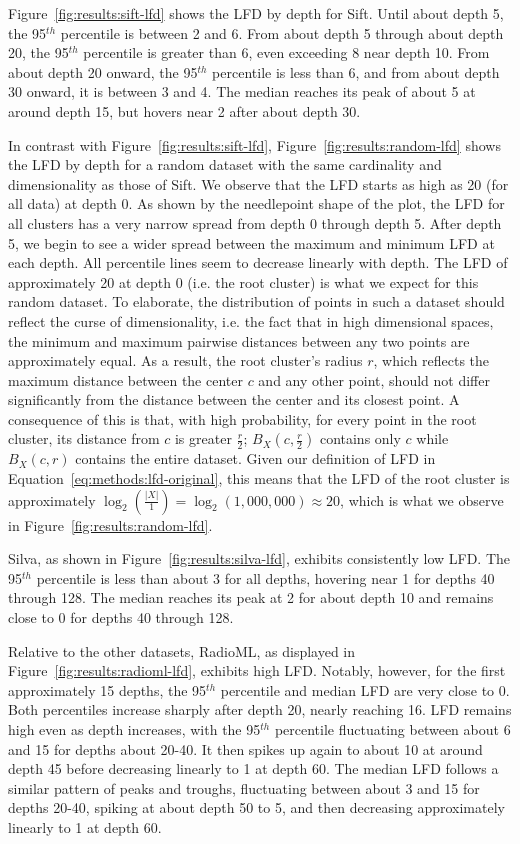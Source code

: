 Figure~\ref{fig:results:sift-lfd} shows the LFD by depth for Sift.
Until about depth 5, the 95$^{th}$ percentile is between 2 and 6.
From about depth 5 through about depth 20, the 95$^{th}$ percentile is greater than 6, even exceeding 8 near depth 10.
From about depth 20 onward, the 95$^{th}$ percentile is less than 6, and from about depth 30 onward, it is between 3 and 4.
The median reaches its peak of about 5 at around depth 15, but hovers near 2 after about depth 30.

In contrast with Figure~\ref{fig:results:sift-lfd}, Figure~\ref{fig:results:random-lfd} shows the LFD by depth for a random dataset with the same cardinality and dimensionality as those of Sift.
We observe that the LFD starts as high as 20 (for all data) at depth 0.
As shown by the needlepoint shape of the plot, the LFD for all clusters has a very narrow spread from depth 0 through depth 5.
After depth 5, we begin to see a wider spread between the maximum and minimum LFD at each depth.
All percentile lines seem to decrease linearly with depth.
The LFD of approximately 20 at depth 0 (i.e. the root cluster) is what we expect for this random dataset.
To elaborate, the distribution of points in such a dataset should reflect the curse of dimensionality, i.e. the fact that in high dimensional spaces, the minimum and maximum pairwise distances between any two points are approximately equal.
As a result, the root cluster's radius $r$, which reflects the maximum distance between the center $c$ and any other point, should not differ significantly from the distance between the center and its closest point.
A consequence of this is that, with high probability, for every point in the root cluster, its distance from $c$ is greater $\tfrac{r}{2}$;
$B_X(c, \tfrac{r}{2})$ contains only $c$ while $B_X(c, r)$ contains the entire dataset.
Given our definition of LFD in Equation~\ref{eq:methods:lfd-original}, this means that the LFD of the root cluster is approximately $\log_2(\frac{|X|}{1}) = \log_2(1,000,000) \approx 20$, which is what we observe in Figure~\ref{fig:results:random-lfd}.

Silva, as shown in Figure~\ref{fig:results:silva-lfd}, exhibits consistently low LFD.
The 95$^{th}$ percentile is less than about 3 for all depths, hovering near 1 for depths 40 through 128.
The median reaches its peak at 2 for about depth 10 and remains close to 0 for depths 40 through 128.

Relative to the other datasets, RadioML, as displayed in Figure~\ref{fig:results:radioml-lfd}, exhibits high LFD.
Notably, however, for the first approximately 15 depths, the 95$^{th}$ percentile and median LFD are very close to 0.
Both percentiles increase sharply after depth 20, nearly reaching 16.
LFD remains high even as depth increases, with the 95$^{th}$ percentile fluctuating between about 6 and 15 for depths about 20-40.
It then spikes up again to about 10 at around depth 45 before decreasing linearly to 1 at depth 60.
The median LFD follows a similar pattern of peaks and troughs, fluctuating between about 3 and 15 for depths 20-40, spiking at about depth 50 to 5, and then decreasing approximately linearly to 1 at depth 60.

